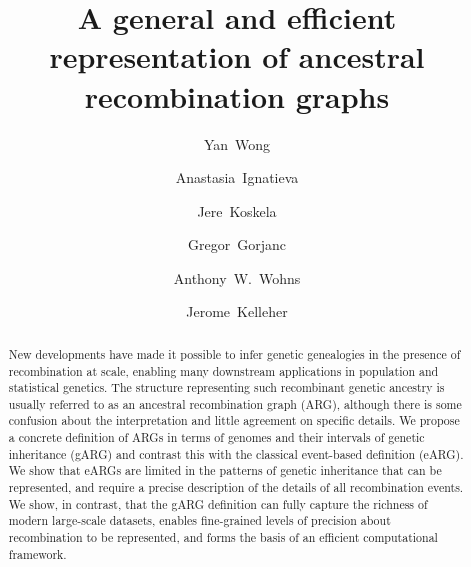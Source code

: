 \documentclass{article}
\begin{document}
\title{\vspace{-1.5em} \bf
A general and efficient representation of ancestral recombination graphs}

\author[1]{Yan~Wong}
\author[2,3$\star$]{Anastasia~Ignatieva}
\author[4,5$\star$]{Jere~Koskela}
\author[6]{Gregor~Gorjanc}
\author[7,8]{Anthony~W.~Wohns}
\author[1$\dagger$]{Jerome~Kelleher}
\affil[ ]{\mbox{}\vspace{-2.5em}}

\maketitle

\setlength{\skip\footins}{1em}
\setlength{\footnotemargin}{0.5em}
\renewcommand{\thefootnote}{\arabic{footnote}}
\renewcommand{\thefootnote}{\fnsymbol{footnote}}

\vspace{-1em}

\begin{abstract}
New developments have made it possible to infer genetic genealogies in
the presence of recombination at scale, enabling many
downstream applications in population and statistical genetics.
The structure representing such recombinant genetic ancestry
is usually referred to as an ancestral recombination graph (ARG),
although there is some confusion about the interpretation and little
agreement on specific details.
We propose a concrete definition of ARGs
in terms of genomes and their intervals of genetic inheritance (gARG)
and contrast this with the classical event-based definition (eARG).
We show that eARGs are limited in the patterns
of genetic inheritance that can be represented,
and require a precise description of the details of all recombination events.
We show, in contrast, that the gARG definition
can fully capture the richness of modern large-scale datasets,
enables fine-grained
levels of precision about recombination to be represented,
and forms the basis of an efficient computational framework.
\end{abstract}
\end{document}
